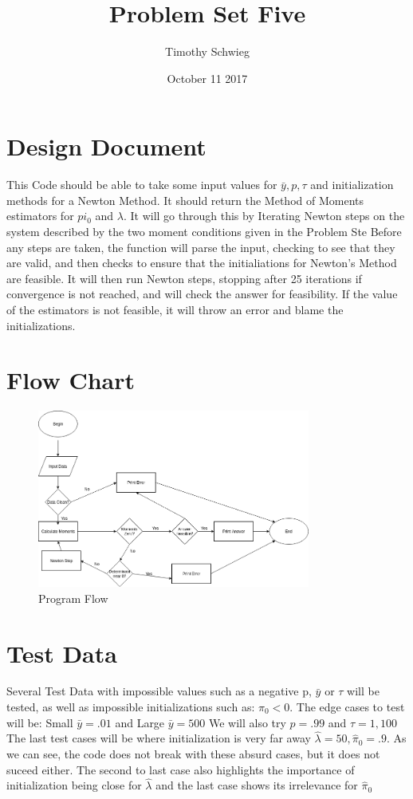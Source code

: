 \documentclass[10pt, letterpaper]{paper}
\title{ Problem Set Five}
\author{ Timothy Schwieg }
\date{ October 11 2017 }
\begin{document}
\maketitle

\section*{Design Document}
This Code should be able to take some input values for $\bar{y}, p, \tau$ and initialization methods for a Newton Method.
It should return the Method of Moments estimators for $pi_0$ and $\lambda$. It will go through this by Iterating Newton steps on the system described by the two moment conditions given in the Problem Ste
Before any steps are taken, the function will parse the input, checking to see that they are valid, and then checks to ensure that the initialiations for Newton's Method are feasible. It will then run Newton steps, stopping after 25 iterations if convergence is not reached, and will check the answer for feasibility. If the value of the estimators is not feasible, it will throw an error and blame the initializations.

\section*{Flow Chart}
\begin{figure}[H]
\centering
\includegraphics[width=0.8\textwidth]{flowchart.png}
\caption{ Program Flow }
\end{figure}

\section*{Test Data}
Several Test Data with impossible values such as a negative p, $\bar{y}$ or $\tau$ will be tested, as well as impossible initializations such as: $\pi_0 < 0$.
The edge cases to test will be: Small $\bar{y} = .01$ and Large $\bar{y} = 500$ 
We will also try $p=.99$ and $\tau = 1,100$
The last test cases will be where initialization is very far away
$\hat \lambda = 50, \hat \pi_0 = .9$.
As we can see, the code does not break with these absurd cases, but it does not suceed either. The second to last case also highlights the importance of initialization being close for $\hat \lambda$ and the last case shows its irrelevance for $\hat \pi_0$
\end{document}
